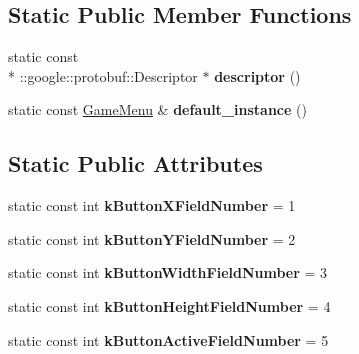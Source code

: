 \subsection*{Static Public Member Functions}
\begin{DoxyCompactItemize}
\item 
\hypertarget{class_game_menu_a9a58d7e3eed9e066adc5b407a36ba292}{static const \\*
\-::google\-::protobuf\-::\-Descriptor $\ast$ {\bfseries descriptor} ()}\label{class_game_menu_a9a58d7e3eed9e066adc5b407a36ba292}

\item 
\hypertarget{class_game_menu_afeb4b86432ba501c5c1627410b0848ad}{static const \hyperlink{class_game_menu}{Game\-Menu} \& {\bfseries default\-\_\-instance} ()}\label{class_game_menu_afeb4b86432ba501c5c1627410b0848ad}

\end{DoxyCompactItemize}
\subsection*{Static Public Attributes}
\begin{DoxyCompactItemize}
\item 
\hypertarget{class_game_menu_abe2fdf1262f6916050a5bcca9222486a}{static const int {\bfseries k\-Button\-X\-Field\-Number} = 1}\label{class_game_menu_abe2fdf1262f6916050a5bcca9222486a}

\item 
\hypertarget{class_game_menu_ae3096491e0598302630a930f29280b6c}{static const int {\bfseries k\-Button\-Y\-Field\-Number} = 2}\label{class_game_menu_ae3096491e0598302630a930f29280b6c}

\item 
\hypertarget{class_game_menu_a9005124c7b657675f79d175b758bbfd3}{static const int {\bfseries k\-Button\-Width\-Field\-Number} = 3}\label{class_game_menu_a9005124c7b657675f79d175b758bbfd3}

\item 
\hypertarget{class_game_menu_aa4c6206a7f24f81750af4160e871d5ba}{static const int {\bfseries k\-Button\-Height\-Field\-Number} = 4}\label{class_game_menu_aa4c6206a7f24f81750af4160e871d5ba}

\item 
\hypertarget{class_game_menu_abf765ea4cffd8e765a7643700214676a}{static const int {\bfseries k\-Button\-Active\-Field\-Number} = 5}\label{class_game_menu_abf765ea4cffd8e765a7643700214676a}

\end{DoxyCompactItemize}
